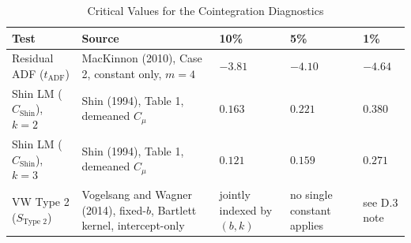 \begin{table}[H]
\centering
\caption{Critical Values for the Cointegration Diagnostics}
\label{tab:critical_values_for_the_cointegration_diagnostic}
\begin{tabular}{p{5.5cm}p{2.2cm}p{2.2cm}p{2.2cm}p{2.2cm}}
\toprule
Test & Source & 10\% & 5\% & 1\% \\
\midrule
Residual ADF ($t_{\text{ADF}}$) & MacKinnon (2010), Case 2, constant only, $m=4$ & $-3.81$ & $-4.10$ & $-4.64$ \\
Shin LM ($C_{\text{Shin}}$), $k=2$ & Shin (1994), Table 1, demeaned $C_\mu$ & $0.163$ & $0.221$ & $0.380$ \\
Shin LM ($C_{\text{Shin}}$), $k=3$ & Shin (1994), Table 1, demeaned $C_\mu$ & $0.121$ & $0.159$ & $0.271$ \\
VW Type 2 ($S_{\text{Type 2}}$) & Vogelsang and Wagner (2014), fixed-$b$, Bartlett kernel, intercept-only & jointly indexed by $(b,k)$ & no single constant applies & see D.3 note \\
\bottomrule
\end{tabular}
\end{table}

